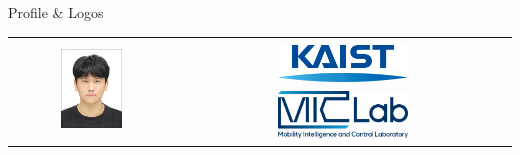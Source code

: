 \documentclass{resume} %
\begin{document}
\begin{minipage}[t]{0.35\textwidth}
    \begin{rSection}{Profile \& Logos}
        \vspace{.5em}
        \begin{center}
            \begin{tabular}{cc}
                \multirow{3}{*}{\includegraphics[width=0.4\textwidth]{ms.jpg}}\vspace{1em} &
                \\
                [-.5em]
                & 
                \includegraphics[width=0.4\textwidth]{logo_KAIST_simple.png}
                \\
                [1em]
                & 
                \includegraphics[width=0.4\textwidth]{logo_MIC.png} \\
            \end{tabular}
        \end{center}
    \end{rSection}
\end{minipage}
\end{document}
